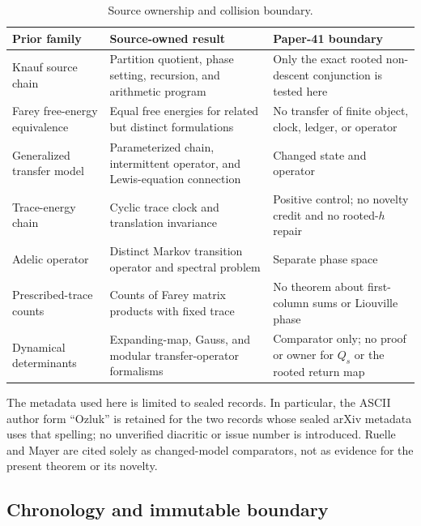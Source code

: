 \begin{table}[H]
\centering
\caption{Source ownership and collision boundary.}
\scriptsize
\setlength{\tabcolsep}{4pt}
\begin{tabularx}{\textwidth}{@{}P{.22\textwidth}YY@{}}
\toprule
Prior family & Source-owned result & Paper-41 boundary \\
\midrule
Knauf source chain
\citep{knauf1993phases,knauf1998spin,knauf1999erratum}
& Partition quotient, phase setting, recursion, and arithmetic program
& Only the exact rooted non-descent conjunction is tested here \\
Farey free-energy equivalence
\citep{klebanOzluk1999farey,fiala2003phase}
& Equal free energies for related but distinct formulations
& No transfer of finite object, clock, ledger, or operator \\
Generalized transfer model \citep{fialaKleban2005generalized}
& Parameterized chain, intermittent operator, and Lewis-equation connection
& Changed state and operator \\
Trace-energy chain \citep{prellbergFialaKleban2006cluster}
& Cyclic trace clock and translation invariance
& Positive control; no novelty credit and no rooted-$h$ repair \\
Adelic operator \citep{knauf2013adelic}
& Distinct Markov transition operator and spectral problem
& Separate phase space \\
Prescribed-trace counts \citep{technau2023farey}
& Counts of Farey matrix products with fixed trace
& No theorem about first-column sums or Liouville phase \\
Dynamical determinants
\citep{ruelle1976zeta,mayer1990gauss,mayer1991selberg}
& Expanding-map, Gauss, and modular transfer-operator formalisms
& Comparator only; no proof or owner for $Q_s$ or the rooted return map \\
\bottomrule
\end{tabularx}
\end{table}

The metadata used here is limited to sealed records.  In particular, the
ASCII author form ``Ozluk'' is retained for the two records whose sealed
arXiv metadata uses that spelling; no unverified diacritic or issue number is
introduced.  Ruelle and Mayer are cited solely as changed-model comparators,
not as evidence for the present theorem or its novelty.

\subsection{Chronology and immutable boundary}

